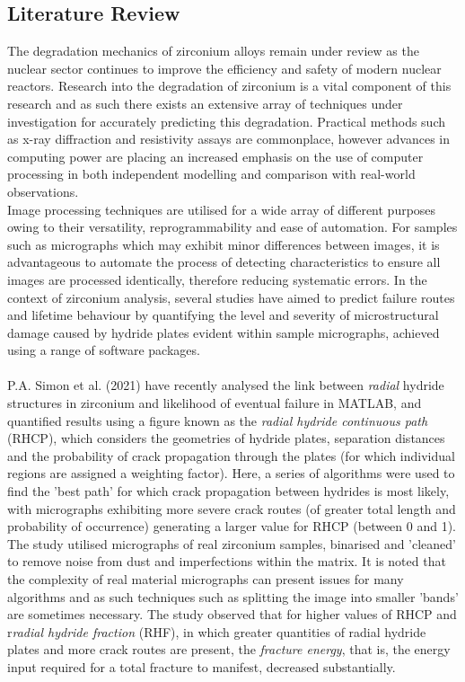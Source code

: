 \documentclass{article}
\begin{document}
	\subsection{Literature Review}
	The degradation mechanics of zirconium alloys remain under review as the nuclear sector continues to improve the efficiency and safety of modern nuclear reactors. Research into the degradation of zirconium is a vital component of this research and as such there exists an extensive array of techniques under investigation for accurately predicting this degradation. Practical methods such as x-ray diffraction and resistivity assays are commonplace, however advances in computing power are placing an increased emphasis on the use of computer processing in both independent modelling and comparison with real-world observations.
	\\
	Image processing techniques are utilised for a wide array of different purposes owing to their versatility, reprogrammability and ease of automation. For samples such as micrographs which may exhibit minor differences between images, it is advantageous to automate the process of detecting characteristics to ensure all images are processed identically, therefore reducing systematic errors. In the context of zirconium analysis, several studies have aimed to predict failure routes and lifetime behaviour by quantifying the level and severity of microstructural damage caused by hydride plates evident within sample micrographs, achieved using a range of software packages.
	\\
	\\
	P.A. Simon et al. (2021) \cite{Simon2021} have recently analysed the link between \textit{radial} hydride structures in zirconium and likelihood of eventual failure in MATLAB, and quantified results using a figure known as the \textit{radial hydride continuous path} (RHCP), which considers the geometries of hydride plates, separation distances and the probability of crack propagation through the plates (for which individual regions are assigned a weighting factor). Here, a series of algorithms were used to find the 'best path' for which crack propagation between hydrides is most likely, with micrographs exhibiting more severe crack routes (of greater total length and probability of occurrence) generating a larger value for RHCP (between 0 and 1). The study utilised micrographs of real zirconium samples, binarised and 'cleaned' to remove noise from dust and imperfections within the matrix. It is noted that the complexity of real material micrographs can present issues for many algorithms and as such techniques such as splitting the image into smaller 'bands' are sometimes necessary. The study observed that for higher values of RHCP and r\textit{radial hydride fraction} (RHF), in which greater quantities of radial hydride plates and more crack routes are present, the \textit{fracture energy}, that is, the energy input required for a total fracture to manifest, decreased substantially.
\end{document}
